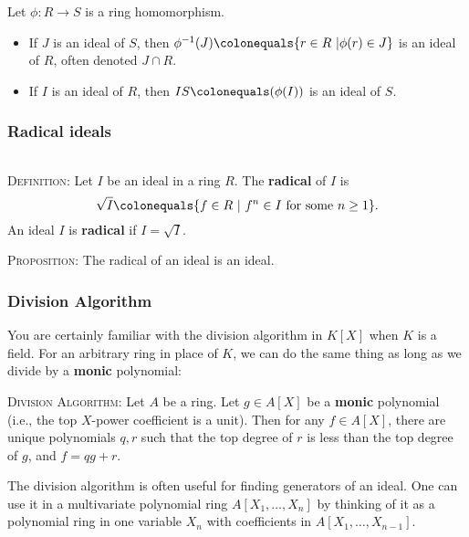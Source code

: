 \documentclass[12pt]{amsart}
\newcommand{\0}{$\phantom{.}$}
\newcommand{\1}{\mathbbm{1}}
\newcommand\ceq{\colonequals}
\newcommand{\sssec}[1]{\subsubsection*{#1}}
\begin{document}
Let $\phi:R\to S$ is a ring homomorphism.
\begin{itemize} \item If $J$ is an ideal of $S$, then $\phi^{-1}(J) \ceq \{ r\in R \ | \phi(r)\in J\}$ is an ideal of $R$, often denoted $J \cap R$.
\item If $I$ is an ideal of $R$, then $IS \ceq (\phi(I) )$ is an ideal of $S$.
\end{itemize}





\sssec{Radical ideals}\0



\noindent \textsc{Definition}: Let $I$ be an ideal in a ring $R$. The \textbf{radical} of $I$ is 
\[ \sqrt{I} \ceq \{ f\in R \ | \ f^n\in I \ \text{for some} \ n\geq1\}.\]
An ideal $I$ is \textbf{radical} if $I=\sqrt{I}$.

\vspace{3mm}

\noindent \textsc{Proposition:} The radical of an ideal is an ideal.

\vspace{3mm}

\subsubsection*{Division Algorithm}
You are certainly familiar with the division algorithm in $K[X]$ when $K$ is a field. For an arbitrary ring in place of $K$, we can do the same thing as long as we divide by a \textbf{monic} polynomial:

\vspace{4mm}

\noindent \textsc{Division Algorithm:} Let $A$ be a ring. Let $g\in A[X]$ be a \textbf{monic} polynomial (i.e., the top $X$-power coefficient is a unit). Then for any $f\in A[X]$, there are unique polynomials $q,r$ such that the top degree of $r$ is less than the top degree of $g$, and $f=qg+r$.

\vspace{4mm}

\noindent The division algorithm is often useful for finding generators of an ideal. One can use it in a multivariate polynomial ring $A[X_1,\dots,X_n]$ by thinking of it as a polynomial ring in one variable $X_n$ with coefficients in $A[X_1,\dots,X_{n-1}]$. 



\vfill

\noindent \hrulefill
\end{document}
